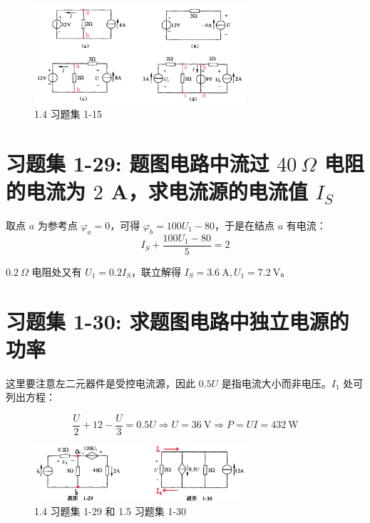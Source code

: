\documentclass[UTF8]{report}
\theoremstyle{MyLineTheoremStyle} %
\theoremstyle{MyBlockTheoremStyle} %
\theoremstyle{MySubsubsectionStyle} %
\begin{document}
\begin{figure}[H]\centering
\includegraphics[width=0.7\textwidth]{assets/1/b82ef4f3b4efd9d0ee903e5f19353345.png}
\caption{ 1.4 习题集 1-15}
\end{figure}

\section{习题集 1-29: 题图电路中流过 $40\ \Omega$ 电阻的电流为 $2$ A，求电流源的电流值 $I_S$}

取点 $a$ 为参考点 $\varphi_a = 0$，可得 $\varphi_b = 100U_1 - 80$，于是在结点 $a$ 有电流：
\begin{equation*}
I_S + \frac{100U_1 - 80}{5} = 2
\end{equation*}

$0.2\ \Omega$ 电阻处又有 $U_1 = 0.2 I_S$，联立解得 $I_S = 3.6 \ \mathrm{A}, U_1 = 7.2 \ \mathrm{V}$。

\section{习题集 1-30: 求题图电路中独立电源的功率}

这里要注意左二元器件是受控电流源，因此 $0.5U$ 是指电流大小而非电压。$I_1$ 处可列出方程：

\begin{equation*}
\frac{U}{2} + 12 - \frac{U}{3} = 0.5U \Longrightarrow U = 36 \ \mathrm{V} \Longrightarrow P = UI = 432 \ \mathrm{W}
\end{equation*}

\begin{figure}[H]\centering
\includegraphics[width=0.7\textwidth]{assets/1/94b342032a5f6622a60b3c9d99e37993.png}
\caption{ 1.4 习题集 1-29 和 1.5 习题集 1-30}
\end{figure}
\end{document}

